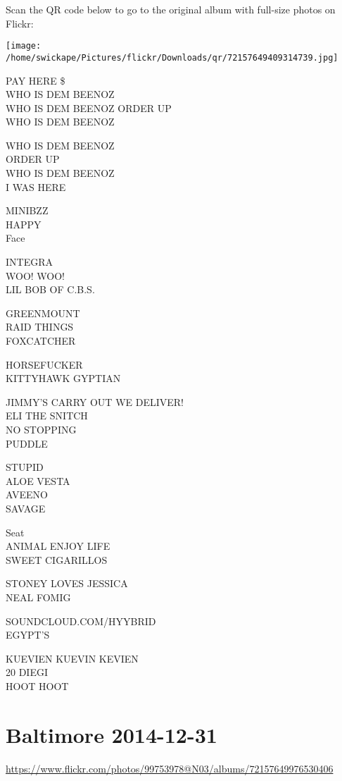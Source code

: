 \documentclass[10pt,letterpaper]{article}
\begin{document}
Scan the QR code below to go to the original album with full-size photos on Flickr:

\texttt{[image: /home/swickape/Pictures/flickr/Downloads/qr/72157649409314739.jpg]}
\pagebreak

PAY HERE \$\\
WHO IS DEM BEENOZ\\
WHO IS DEM BEENOZ ORDER UP\\
WHO IS DEM BEENOZ

WHO IS DEM BEENOZ\\
ORDER UP\\
WHO IS DEM BEENOZ\\
I WAS HERE

MINIBZZ\\
HAPPY\\
Face

INTEGRA\\
WOO!  WOO!\\
LIL BOB OF C.B.S.

GREENMOUNT\\
RAID THINGS\\
FOXCATCHER

HORSEFUCKER\\
KITTYHAWK GYPTIAN

JIMMY'S CARRY OUT WE DELIVER!\\
ELI THE SNITCH\\
NO STOPPING\\
PUDDLE

STUPID\\
ALOE VESTA\\
AVEENO\\
SAVAGE

Seat\\
ANIMAL ENJOY LIFE\\
SWEET CIGARILLOS

STONEY LOVES JESSICA\\
NEAL FOMIG

SOUNDCLOUD.COM/HYYBRID\\
EGYPT'S

KUEVIEN KUEVIN KEVIEN\\
20 DIEGI\\
HOOT HOOT
\pagebreak

\section*{Baltimore 2014-12-31}

\url{https://www.flickr.com/photos/99753978@N03/albums/72157649976530406}
\end{document}
